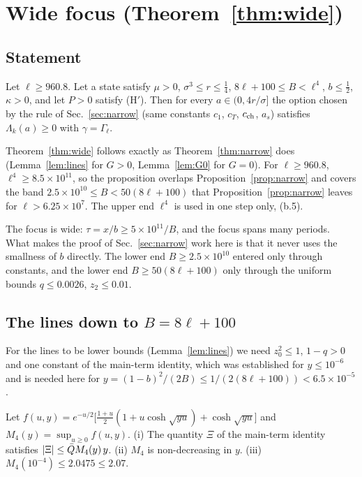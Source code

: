 \section{Wide focus (Theorem~\ref{thm:wide})}
\label{sec:wide}

\subsection{Statement}

\begin{proposition} 
\label{prop:wide}
Let $\ell\ge960.8$.
Let a state satisfy $\mu>0$, $\sigma^3\le r\le\tfrac14$, $8\ell+100\le B<\ell^4$, $b\le\tfrac12$, $\kappa>0$, and let $P>0$ satisfy (H$'$).
Then for every $a\in(0,4r/\sigma]$ the option chosen by the rule of Sec.~\ref{sec:narrow} (same constants $c_1$, $c_T$, $c_{\rm ch}$, $a_s$) satisfies $\Lambda_k(a)\ge0$ with $\gamma=\Gamma_\ell$.
\end{proposition}

Theorem~\ref{thm:wide} follows exactly as Theorem~\ref{thm:narrow} does (Lemma~\ref{lem:lines} for $G>0$, Lemma~\ref{lem:G0} for $G=0$).
For $\ell\ge960.8$, $\ell^4\ge8.5\times10^{11}$, so the proposition overlaps Proposition~\ref{prop:narrow} and covers the band $2.5\times10^{10}\le B<50(8\ell+100)$ that Proposition~\ref{prop:narrow} leaves for $\ell>6.25\times10^7$.
The upper end $\ell^4$ is used in one step only, (b.5).

The focus is wide: $\tau=x/b\ge5\times10^{11}/B$, and the focus spans many periods.
What makes the proof of Sec.~\ref{sec:narrow} work here is that it never uses the smallness of $b$ directly.
The lower end $B\ge2.5\times10^{10}$ entered only through constants, and the lower end $B\ge50(8\ell+100)$ only through the uniform bounds $q\le0.0026$, $z_2\le0.01$.

\subsection{The lines down to $B=8\ell+100$}

For the lines to be lower bounds (Lemma~\ref{lem:lines}) we need $z_0^2\le1$, $1-q>0$ and one constant of the main-term identity, which was established for $y\le10^{-6}$ and is needed here for $y=(1-b)^2/(2B)\le1/(2(8\ell+100))<6.5\times10^{-5}$.

\begin{lemma} 
\label{lem:M4}
Let $f(u,y)=e^{-u/2}\bigl[\tfrac{1+u}2(1+u\cosh\sqrt{yu})+\cosh\sqrt{yu}\bigr]$ and $M_4(y)=\sup_{u\ge0}f(u,y)$.
(i) The quantity $\Xi$ of the main-term identity satisfies $|\Xi|\le\bar Q M_4(y)\,y$.
(ii) $M_4$ is non-decreasing in $y$.
(iii) $M_4(10^{-4})\le2.0475\le2.07$.
\end{lemma}

